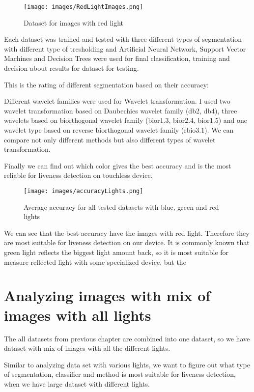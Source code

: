\documentclass{article}
\begin{document}
\begin{figure}[htbp]
    \centering
    \texttt{[image: images/RedLightImages.png]}
    \caption{Dataset for images with red light}
\end{figure}

Each dataset was trained and tested with three different types of segmentation with different type of tresholding and Artificial Neural Network, Support Vector Machines and Decision Trees were used for final classification, training and decision about results for dataset for testing.  

This is the rating of different segmentation based on their accuracy:

Different wavelet families were used for Wavelet transformation. I used two wavelet transformation based on Daubechies wavelet family (db2, db4), three wavelets based on biorthogonal wavelet family (bior1.3, bior2.4, bior1.5) and one wavelet type based on reverse biorthogonal wavelet family (rbio3.1). We can compare not only different methods but also different types of wavelet transformation.

Finally we can find out which color gives the best accuracy and is the most reliable for liveness detection on touchless device.

\begin{figure}[htbp]
    \centering
    \texttt{[image: images/accuracyLights.png]}
    \caption{Average accuracy for all tested datasets with blue, green and red lights}
\end{figure}

We can see that the best accuracy have the images with red light. Therefore they are most suitable for liveness detection on our device. It is commonly known that green light reflects the biggest light amount back, so it is most suitable for measure reflected light with some specialized device, but the 

\section{Analyzing images with mix of images with all lights}
The all datasets from previous chapter are combined into one dataset, so we have dataset with mix of images with all the different lights.

Similar to analyzing data set with various lights, we want to figure out what type of segmentation, classifier and method is most suitable for liveness detection, when we have large dataset with different lights.
\end{document}
